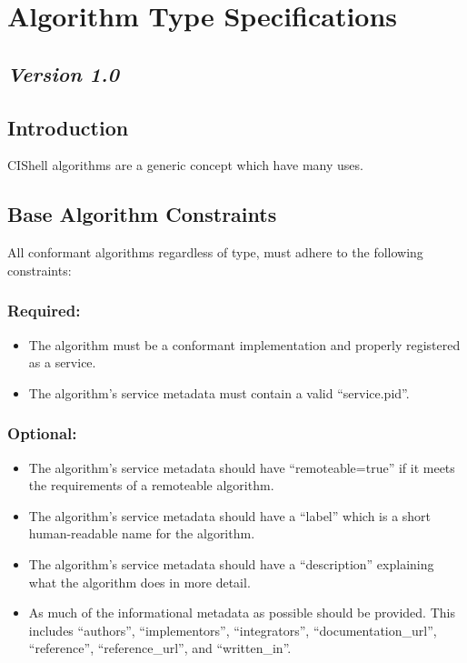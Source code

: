 \section{Algorithm Type Specifications}

\subsection*{\textit{Version 1.0}}

\label{algConstraints}
\subsection{Introduction}

CIShell algorithms are a generic concept which have many uses. 

\subsection{Base Algorithm Constraints}

All conformant algorithms regardless of type, must adhere to the following
constraints:

\subsubsection*{Required:}
\begin{itemize}
  \item The algorithm must be a conformant 
  implementation and properly registered as a service.
  \item The algorithm's service metadata must contain a valid ``service.pid''.
\end{itemize}

\subsubsection*{Optional:}
\begin{itemize}
  \item The algorithm's service metadata should have ``remoteable=true'' if it
  meets the requirements of a remoteable algorithm.
  \item The algorithm's service metadata should have a ``label'' which is a
  short human-readable name for the algorithm.
  \item The algorithm's service metadata should have a ``description''
  explaining what the algorithm does in more detail.
  \item As much of the informational metadata as possible should be
  provided. This includes ``authors'', ``implementors'', ``integrators'',
  ``documentation\_url'', ``reference'', ``reference\_url'', and ``written\_in''.
\end{itemize}

